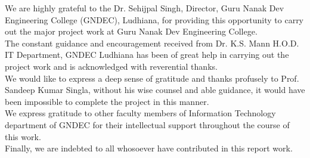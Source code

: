 \begin{Large}
\end{Large}
\vskip 0.1in %



\noindent We are highly grateful to the Dr. Sehijpal Singh, Director, Guru Nanak Dev Engineering College (GNDEC), Ludhiana, for providing this opportunity to carry out the major project work at Guru Nanak Dev Engineering College.\\

\noindent The constant guidance and encouragement received from Dr. K.S. Mann H.O.D. IT Department, GNDEC Ludhiana has been of great help in carrying out the project work and is acknowledged with reverential thanks.\\

\noindent We would like to express a deep sense of gratitude and thanks profusely to Prof. Sandeep Kumar Singla, without his wise counsel and able guidance, it would have been impossible to complete the project in this manner.\\

\noindent We express gratitude to other faculty members of Information Technology department of GNDEC for their intellectual support throughout the course of this work.\\

\noindent Finally, we are indebted to all whosoever have contributed in this report work.



\vskip 0.4in
\noindent 
\textbf{\studentName}

